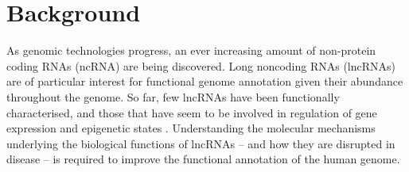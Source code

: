 \documentclass{bmcart}
\begin{document}
\begin{frontmatter}
\begin{abstractbox}
\begin{keyword}
\end{keyword}


\end{abstractbox}
%

\end{frontmatter}





\section*{Background}

As genomic technologies progress, an ever increasing amount of non-protein coding RNAs (ncRNA) are being discovered. Long noncoding RNAs (lncRNAs) are of particular interest for functional genome
annotation given their abundance throughout the genome. So far, few lncRNAs have been functionally characterised, and those that have seem to be involved in regulation of gene expression and epigenetic states 
\cite{morris2014rise,engreitz2016long}. Understanding the
molecular mechanisms underlying the biological functions of lncRNAs -- and how
they are disrupted in disease -- is required to improve the functional
annotation of the human genome. \\
\end{document}
